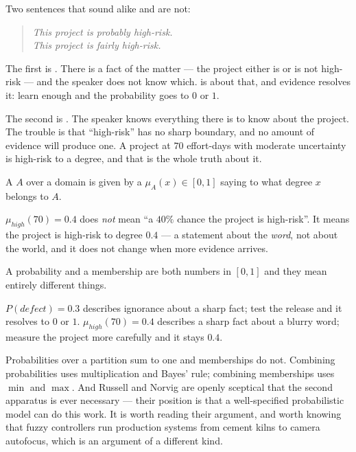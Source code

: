 Two sentences that sound alike and are not:

\begin{quote}
\emph{This project is probably high-risk.}\\
\emph{This project is fairly high-risk.}
\end{quote}

The first is . There is a fact of the matter --- the project either
is or is not high-risk --- and the speaker does not know which.
 is about that, and evidence resolves it: learn enough and the
probability goes to $0$ or $1$.

The second is . The speaker knows everything there is to know about
the project. The trouble is that ``high-risk'' has no sharp boundary, and no amount
of evidence will produce one. A project at $70$ effort-days with moderate
uncertainty is high-risk to a degree, and that is the whole truth about it.

\begin{definitionbox}
A  $A$ over a domain is given by a 
$\mu_{A}(x) \in [0,1]$ saying to what degree $x$ belongs to $A$.

$\mu_{\mathit{high}}(70) = 0.4$ does \emph{not} mean ``a $40\%$ chance the project is
high-risk''. It means the project is high-risk to degree $0.4$ --- a statement about
the \emph{word}, not about the world, and it does not change when more evidence
arrives.
\end{definitionbox}

\begin{alertbox}
A probability and a membership are both numbers in $[0,1]$ and they mean entirely
different things.

$P(\mathit{defect}) = 0.3$ describes ignorance about a sharp fact; test the release
and it resolves to $0$ or $1$. $\mu_{\mathit{high}}(70) = 0.4$ describes a sharp
fact about a blurry word; measure the project more carefully and it stays $0.4$.

Probabilities over a partition sum to one and memberships do not. Combining
probabilities uses multiplication and Bayes' rule; combining memberships uses
$\min$ and $\max$. And Russell and Norvig are openly sceptical that the second
apparatus is ever necessary --- their position is that a well-specified
probabilistic model can do this work. It is worth reading their argument, and
worth knowing that fuzzy controllers run production systems from cement kilns to
camera autofocus, which is an argument of a different kind.
\end{alertbox}


